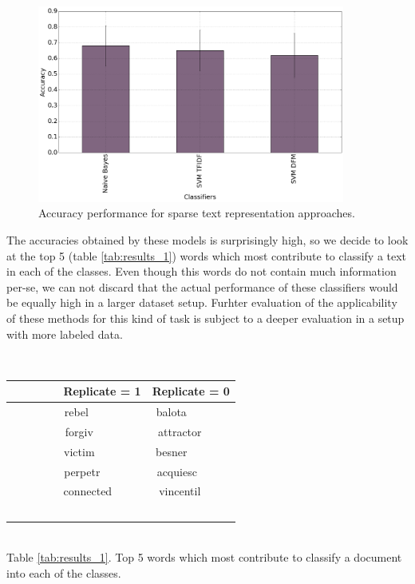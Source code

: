 \documentclass[12pt]{article}
\begin{document}
\begin{figure}[htbp]
    \centering
    \includegraphics[width=0.9\textwidth]{barplot_words_classifiers}
    \caption{Accuracy performance for sparse text representation approaches.}
    \label{fig:bow_model}
\end{figure}

The accuracies obtained by these models is surprisingly high, so we decide to look at the top 5 (table \ref{tab:results_1}) words which most contribute to classify a text in each of the classes. Even though this words do not contain much information per-se, we can not discard that the actual performance of these classifiers would be equally high in a larger dataset setup. Furhter evaluation of the applicability of these methods for this kind of task is subject to a deeper evaluation in a setup with more labeled data. 

\begin{center}
\label{tab:results_1}
    \begin{tabular}{c|c}
        Replicate = 1 & Replicate = 0 \\ \hline \hline
        rebel         & balota        \\ 
        forgiv        & attractor     \\ 
        victim        & besner        \\ 
        perpetr       & acquiesc      \\ 
        connected     & vincentil     \\
    \end{tabular} \\

    Table \ref{tab:results_1}. Top 5 words which most contribute to classify a document into each of the classes. 
\end{center}
\end{document}
